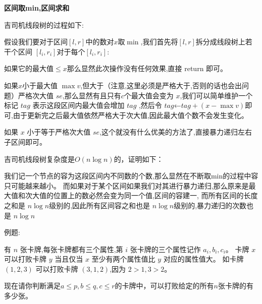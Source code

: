 \documentclass[a4paper, fontset=none]{ctexart}
\begin{document}
\textbf{区间取min,区间求和}

吉司机线段树的过程如下:

假设我们要对于区间$[l, r]$中的数对$x$取$\min$,我们首先将$[l, r]$拆分成线段树上若干个区间
$[l_i, r_i]$对于每个$[l_i, r_i]$:

如果它的最大值$\leqslant x$那么显然此次操作没有任何效果,直接 return 即可。

如果$x$小于最大值 $\max v$,但大于（注意,这里必须是严格大于,否则的话也会出问题）严格次大值
$se$,那么显然有且只有$c$个最大值会变为
$x$,我们可以简单维护一个标记 $tag$ 表示这段区间内最大值会增加 $tag$
,然后令 $tag$←$tag+(x-\max v)$即可,由于更新完之后最大值依然严格大于次大值,因此最大值个数不会发生变化。

如果 $x$ 小于等于严格次大值 $se$,这个就没有什么优美的方法了,直接暴力递归左右子区间即可。

吉司机线段树复杂度是$O(n\log n)$的，证明如下：

我们记一个节点的容为这段区间内不同数的个数,那么显然在不断取min的过程中容只可能越来越小。
而如果对于某个区间如果我们对其进行暴力递归,那么原来是最大值和次大值的位置上的数必然会变为同一个值,区间的容建一,
而所有区间的长度之和是 $n\log n$级别的,因此所有区间容之和也是 $n\log n$级别的,暴力递归的次数也是 $n\log n$


例题:

有 $n$ 张卡牌,每张卡牌都有三个属性,第 $i$ 张卡牌的三个属性记作 $a_i, b_i, c_i$。
卡牌 $x$ 可以打败卡牌 $y$ 当且仅当 $x$ 至少有两个属性值比 $y$ 对应的属性值大。
如卡牌 $(1, 2, 3)$ 可以打败卡牌 $(3, 1, 2)$,因为 $2 > 1, 3 > 2$。

现在请你判断满足$a\leqslant p, b\leqslant q, c\leqslant r$的卡牌中，可以打败给定的所有$n$张卡牌的有多少张。
\end{document}
